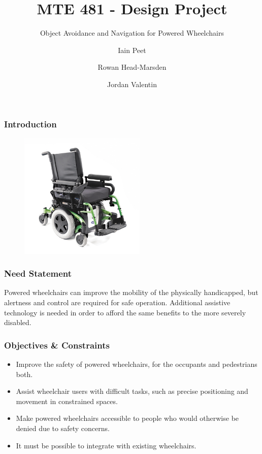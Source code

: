 \documentclass{beamer}
\title{MTE 481 - Design Project}
\subtitle{Object Avoidance and Navigation for Powered Wheelchairs}
\author{Iain Peet \and Rowan Head-Marsden \and Jordan Valentin}
\begin{document}
\begin{frame}
  \titlepage
\end{frame}

\begin{frame}
  \frametitle{Introduction}
  \begin{figure}
    \centering
    \includegraphics[width=6cm]{wheelchair.jpg} 
  \end{figure}
\end{frame}

\begin{frame}
  \frametitle{Need Statement}
  Powered wheelchairs can improve the mobility of the physically handicapped, but 
  alertness and control are required for safe operation.
  Additional assistive technology is needed in order to afford the same benefits
  to the more severely disabled.
\end{frame}

\begin{frame}
  \frametitle{Objectives \& Constraints}
  \begin{itemize}
    \item Improve the safety of powered wheelchairs, for the occupants and pedestrians both. \\
    \item Assist wheelchair users with difficult tasks, such as precise positioning and movement in constrained spaces.  \\
    \item Make powered wheelchairs accessible to people who would otherwise be denied due to safety concerns. \\
    \item It must be possible to integrate with existing wheelchairs. \\
  \end{itemize}
\end{frame}
\end{document}
